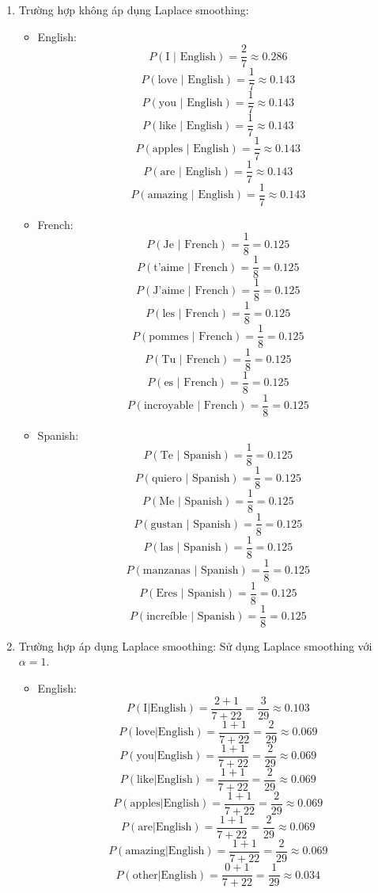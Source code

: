 \begin{enumerate}
    \item Trường hợp không áp dụng Laplace smoothing:
    \begin{itemize}
        \item English:
\[
P(\text{I | English}) = \frac{2}{7} \approx 0.286
\]
\[
P(\text{love | English}) = \frac{1}{7} \approx 0.143
\]
\[
P(\text{you | English}) = \frac{1}{7} \approx 0.143
\]
\[
P(\text{like | English}) = \frac{1}{7} \approx 0.143
\]
\[
P(\text{apples | English}) = \frac{1}{7} \approx 0.143
\]
\[
P(\text{are | English}) = \frac{1}{7} \approx 0.143
\]
\[
P(\text{amazing | English}) = \frac{1}{7} \approx 0.143
\]

        \item French:
\[
P(\text{Je | French}) = \frac{1}{8} = 0.125
\]
\[
P(\text{t'aime | French}) = \frac{1}{8} = 0.125
\]
\[
P(\text{J'aime | French}) = \frac{1}{8} = 0.125
\]
\[
P(\text{les | French}) = \frac{1}{8} = 0.125
\]
\[
P(\text{pommes | French}) = \frac{1}{8} = 0.125
\]
\[
P(\text{Tu | French}) = \frac{1}{8} = 0.125
\]
\[
P(\text{es | French}) = \frac{1}{8} = 0.125
\]
\[
P(\text{incroyable | French}) = \frac{1}{8} = 0.125
\]

        \item Spanish:
\[
P(\text{Te | Spanish}) = \frac{1}{8} = 0.125
\]
\[
P(\text{quiero | Spanish}) = \frac{1}{8} = 0.125
\]
\[
P(\text{Me | Spanish}) = \frac{1}{8} = 0.125
\]
\[
P(\text{gustan | Spanish}) = \frac{1}{8} = 0.125
\]
\[
P(\text{las | Spanish}) = \frac{1}{8} = 0.125
\]
\[
P(\text{manzanas | Spanish}) = \frac{1}{8} = 0.125
\]
\[
P(\text{Eres | Spanish}) = \frac{1}{8} = 0.125
\]
\[
P(\text{increíble | Spanish}) = \frac{1}{8} = 0.125
\]
    \end{itemize}
    \clearpage
    \item Trường hợp áp dụng Laplace smoothing: Sử dụng Laplace smoothing với \(\alpha = 1\).
    \begin{itemize}
        \item English:
  \[
  P(\text{I} | \text{English}) = \frac{2+1}{7+22} = \frac{3}{29} \approx 0.103
  \]
  \[
  P(\text{love} | \text{English}) = \frac{1+1}{7+22} = \frac{2}{29} \approx 0.069
  \]
  \[
  P(\text{you} | \text{English}) = \frac{1+1}{7+22} = \frac{2}{29} \approx 0.069
  \]
  \[
  P(\text{like} | \text{English}) = \frac{1+1}{7+22} = \frac{2}{29} \approx 0.069
  \]
  \[
  P(\text{apples} | \text{English}) = \frac{1+1}{7+22} = \frac{2}{29} \approx 0.069
  \]
  \[
  P(\text{are} | \text{English}) = \frac{1+1}{7+22} = \frac{2}{29} \approx 0.069
  \]
  \[
  P(\text{amazing} | \text{English}) = \frac{1+1}{7+22} = \frac{2}{29} \approx 0.069
  \]
  \[
  P(\text{other} | \text{English}) = \frac{0+1}{7+22} = \frac{1}{29} \approx 0.034
  \]


\end{itemize}
\end{enumerate}
